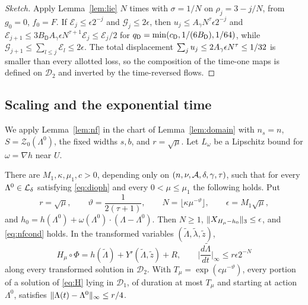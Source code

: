 \begin{proof}[Sketch]
Apply Lemma~\ref{lem:lie} $N$ times with $\sigma=1/N$ on $\rho_j=3-j/N$, from $g_0=0$, $f_0=F$. If $\mathcal E_j\le\epsilon2^{-j}$ and $\mathcal G_j\le2\epsilon$, then $u_j\le A_\gamma N^\tau\epsilon2^{-j}$ and $\mathcal E_{j+1}\le3B_{\mathsf D}A_\gamma\epsilon N^{\tau+1}\mathcal E_j\le\mathcal E_j/2$ for $q_{\mathsf D}=\min(c_{\mathsf D},1/(6B_{\mathsf D}),1/64)$, while $\mathcal G_{j+1}\le\sum_{l\le j}\mathcal E_l\le2\epsilon$. The total displacement $\sum_ju_j\le2A_\gamma\epsilon N^\tau\le1/32$ is smaller than every allotted loss, so the composition of the time-one maps is defined on $\mathcal D_2$ and inverted by the time-reversed flows.
\end{proof}

\subsection{Scaling and the exponential time}

We apply Lemma~\ref{lem:nf} in the chart of Lemma~\ref{lem:domain} with $n_s=n$, $S=\mathcal Z_0(\Lambda^0)$, the fixed widths $s,b$, and $r=\sqrt\mu$. Let $L_\omega$ be a Lipschitz bound for $\omega=\nabla h$ near $U$.

\begin{lemma}[Scaling]
\label{lem:scaling}
There are $M_1,\kappa,\mu_1,c>0$, depending only on $(n,\nu,\mathcal{A},\delta,\gamma,\tau)$, such that for every $\Lambda^0\in\mathcal{L}_\delta$ satisfying \eqref{eq:dioph} and every $0<\mu\le\mu_1$ the following holds. Put
\begin{equation}
\label{eq:scaling}
r=\sqrt\mu,\qquad \vartheta=\frac{1}{2(\tau+1)},\qquad N=\lfloor\kappa\mu^{-\vartheta}\rfloor,\qquad \epsilon=M_1\sqrt\mu,
\end{equation}
and $h_0=h(\Lambda^0)+\omega(\Lambda^0)\cdot(\Lambda-\Lambda^0)$. Then $N\ge1$, $\lVert X_{H_\mu-h_0}\rVert_3\le\epsilon$, and \eqref{eq:nfcond} holds. In the transformed variables $(\tilde\Lambda,\tilde\lambda,\tilde z)$,
\begin{equation}
\label{eq:Jdot}
H_\mu\circ\Phi=h(\tilde\Lambda)+Y'(\tilde\Lambda,\tilde z)+R,\qquad \Big|\frac{d\tilde\Lambda}{dt}\Big|_\infty\le r\epsilon2^{-N}
\end{equation}
along every transformed solution in $\mathcal D_2$. With $T_\mu=\exp(c\mu^{-\vartheta})$, every portion of a solution of \eqref{eq:H} lying in $\mathcal D_1$, of duration at most $T_\mu$ and starting at action $\Lambda^0$, satisfies $\lVert \Lambda(t)-\Lambda^0\rVert_\infty\le r/4$.
\end{lemma}

